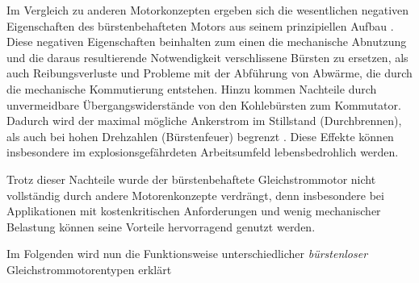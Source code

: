 \glqq{}Im  Vergleich  zu  anderen  Motorkonzepten  ergeben  sich  die  wesentlichen negativen Eigenschaften des bürstenbehafteten Motors aus seinem prinzipiellen Aufbau\grqq{} \parencite[S. 52]{Probst2011}. Diese negativen Eigenschaften beinhalten zum einen die mechanische Abnutzung und die daraus resultierende Notwendigkeit verschlissene Bürsten zu ersetzen, als auch Reibungsverluste und Probleme mit der Abführung von Abwärme, die durch die mechanische Kommutierung entstehen. Hinzu kommen Nachteile durch unvermeidbare Übergangswiderstände von den Kohlebürsten zum Kommutator. Dadurch wird der maximal mögliche Ankerstrom im Stillstand (Durchbrennen), als auch bei hohen Drehzahlen (Bürstenfeuer) begrenzt \parencite[vgl.][S. 52]{Probst2011}. Diese Effekte können insbesondere im explosionsgefährdeten Arbeitsumfeld lebensbedrohlich werden.

Trotz dieser Nachteile wurde der bürstenbehaftete Gleichstrommotor nicht vollständig durch andere Motorenkonzepte verdrängt, denn insbesondere bei Applikationen mit kostenkritischen Anforderungen und wenig mechanischer Belastung können seine Vorteile hervorragend genutzt werden.

Im Folgenden wird nun die Funktionsweise unterschiedlicher \emph{bürstenloser} Gleichstrommotorentypen erklärt

